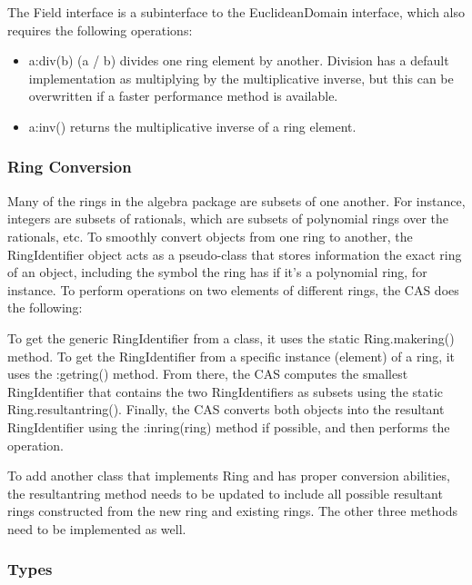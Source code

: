 \documentclass{article}
\begin{document}
The {\ttfamily Field} interface is a subinterface to the {\ttfamily EuclideanDomain} interface, which also requires the following operations:

\begin{itemize}
    \item {\ttfamily a:div(b) (a / b)} divides one ring element by another. Division has a default implementation as multiplying by the multiplicative inverse, but this can be overwritten if a faster performance method is available.
     \item {\ttfamily a:inv()} returns the multiplicative inverse of a ring element.
\end{itemize}


\subsubsection{Ring Conversion}

Many of the rings in the algebra package are subsets of one another. For instance, integers are subsets of rationals, which are subsets of polynomial rings over the rationals, etc. To smoothly convert objects from one ring to another, the {\ttfamily RingIdentifier} object acts as a pseudo-class that stores information the exact ring of an object, including the symbol the ring has if it's a polynomial ring, for instance. To perform operations on two elements of different rings, the CAS does the following: 

To get the generic {\ttfamily RingIdentifier} from a class, it uses the static {\ttfamily Ring.makering()} method. To get the {\ttfamily RingIdentifier} from a specific instance (element) of a ring, it uses the {\ttfamily :getring()} method. From there, the CAS computes the smallest {\ttfamily RingIdentifier} that contains the two {\ttfamily RingIdentifier}s as subsets using the static {\ttfamily Ring.resultantring()}. Finally, the CAS converts both objects into the resultant {\ttfamily RingIdentifier} using the {\ttfamily :inring(ring)} method if possible, and then performs the operation.

To add another class that implements {\ttfamily Ring} and has proper conversion abilities, the {\ttfamily resultantring} method needs to be updated to include all possible resultant rings constructed from the new ring and existing rings. The other three methods need to be implemented as well.

\subsubsection{Types}
\end{document}
